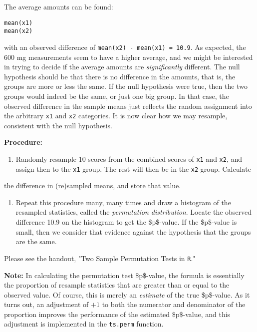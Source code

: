 \documentclass[11pt,english]{scrbook}
\begin{document}
The average amounts can be found:

\begin{verbatim}
mean(x1)
mean(x2)
\end{verbatim}


with an observed difference of \texttt{mean(x2) - mean(x1) = 10.9}. As expected, the 600 mg measurements seem to have a higher average, and we might be interested in trying to decide if the average amounts are \emph{significantly} different. The null hypothesis should be that there is no difference in the amounts, that is, the groups are more or less the same. If the null hypothesis were true, then the two groups would indeed be the same, or just one big group. In that case, the observed difference in the sample means just reflects the random assignment into the arbitrary \texttt{x1} and \texttt{x2} categories.
It is now clear how we may resample, consistent with the null hypothesis.

\textbf{Procedure:}

\begin{enumerate}
\item Randomly resample 10 scores from the combined scores of \texttt{x1} and \texttt{x2}, and assign then to the \texttt{x1} group.  The rest will then be in the \texttt{x2} group. Calculate
\end{enumerate}
the difference in (re)sampled means, and store that value.  

\begin{enumerate}
\item Repeat this procedure many, many times and draw a histogram of the resampled statistics, called the \emph{permutation distribution}.  Locate the observed difference 10.9 on the histogram to get the \$p\$-value. If the \$p\$-value is small, then we consider that evidence against the hypothesis that the groups are the same.
\end{enumerate}


Please see the handout, "Two Sample Permutation Tests in \texttt{R}."

\textbf{Note:} In calculating the permutation test \$p\$-value, the formula is essentially the proportion of resample statistics that are greater than or equal to the observed value. Of course, this is merely an \emph{estimate} of the true \$p\$-value. As it turns out, an adjustment of \(+1\) to both the numerator and denominator of the
proportion improves the performance of the estimated \$p\$-value, and this adjustment is implemented in the \texttt{ts.perm} function.
\end{document}
